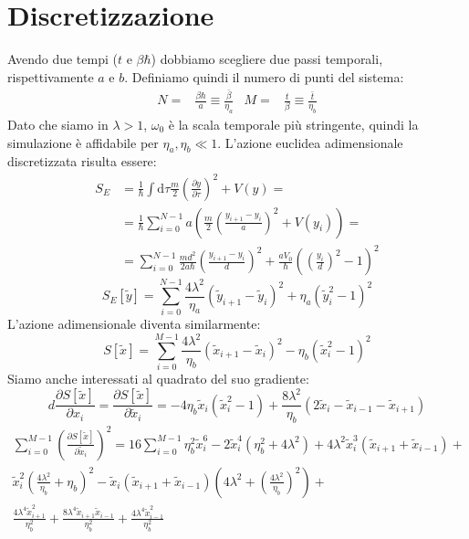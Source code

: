 \documentclass[italian]{article}
\newcommand{\dderiv}[2]{\frac{\partial #1}{\partial #2}}
\begin{document}
	\section{Discretizzazione}
	Avendo due tempi ($t$ e $\beta\hbar$) dobbiamo scegliere due passi temporali, rispettivamente $a$ e $b$. Definiamo quindi il numero di punti del sistema:
	\begin{align*}
		N =& \frac{\beta\hbar}{a} \equiv \frac{\bar{\beta}}{\eta_a} &
		 M =& \frac{t}{\beta} \equiv \frac{\bar{t}}{\eta_b}
	\end{align*}
	Dato che siamo in $\lambda > 1$, $\omega_0$ è la scala temporale più stringente, quindi la simulazione è affidabile per $\eta_a, \eta_b \ll 1$.
	L'azione euclidea adimensionale discretizzata risulta essere:
	\begin{align*}
		S_E &= \frac{1}{\hbar} \int \mathrm{d}\tau \frac{m}{2} \left(\dderiv{y}{\tau}\right)^2 + V(y) = \\
		&=\frac{1}{\hbar}\sum_{i=0}^{N-1} a \left( \frac{m}{2} \left(\frac{y_{i+1}-y_i}{a}\right)^2 + V(y_i) \right) = \\
		&=\sum_{i=0}^{N-1} \frac{md^2}{2a\hbar}\left(\frac{y_{i+1}-y_i}{d}\right)^2+ 
		\frac{aV_0}{\hbar} \left(\left(\frac{y_i}{d}\right)^2 -1\right)^2
	\end{align*}
	\begin{equation}
		S_E[\tilde{y}] = \sum_{i=0}^{N-1} \frac{4\lambda^2}{\eta_a}\left(\tilde{y}_{i+1}-\tilde{y}_i\right)^2 + 
		\eta_a \left(\tilde{y}_i^2 -1\right)^2
	\end{equation}
	L'azione adimensionale diventa similarmente:
	\begin{equation}
		S[\tilde{x}] = \sum_{i=0}^{M-1} \frac{4\lambda^2}{\eta_b}\left(\tilde{x}_{i+1}-\tilde{x}_i\right)^2 -
		\eta_b \left(\tilde{x}_i^2 -1\right)^2
	\end{equation}
	Siamo anche interessati al quadrato del suo gradiente:
	\begin{equation*}
		d\dderiv{S[\tilde{x}]}{x_i} = \dderiv{S[\tilde{x}]}{\tilde{x}_i} = - 4 \eta_{b} \tilde{x}_{i} \left(\tilde{x}_{i}^{2} - 1\right) + \frac{8 \lambda^{2}}{\eta_{b}} \left(2\tilde{x}_{i} - \tilde{x}_{i-1} - \tilde{x}_{i+1}\right)
	\end{equation*}
	\begin{multline}
		 \sum_{i=0}^{M-1}\left(\dderiv{S[\tilde{x}]}{\tilde{x}_i}\right)^2 =
		 16 \sum_{i=0}^{M-1} 
		\eta_{b}^{2} \tilde{x}_{i}^{6} -
		 2 \tilde{x}_{i}^{4} \left(\eta_{b}^{2} + 4 \lambda^{2}\right) +
		 4 \lambda^{2} \tilde{x}_{i}^{3} \left(\tilde{x}_{i+1} + \tilde{x}_{i-1}\right) + \\
	 	 \tilde{x}_{i}^{2} \left(\frac{4 \lambda^{2}}{\eta_{b}} + \eta_{b} \right)^2 - 
		 \tilde{x}_{i} \left(\tilde{x}_{i+1} + \tilde{x}_{i-1}\right)\left(4 \lambda^{2} + \left(\frac{4 \lambda^{2}}{\eta_{b}}\right)^{2}\right) + \\
		 \frac{4 \lambda^{4} \tilde{x}_{i+1}^{2}}{\eta_{b}^{2}} + 
		 \frac{8 \lambda^{4} \tilde{x}_{i+1} \tilde{x}_{i-1}}{\eta_{b}^{2}} + 
		 \frac{4 \lambda^{4} \tilde{x}_{i-1}^{2}}{\eta_{b}^{2}}
	\end{multline}
\end{document}
